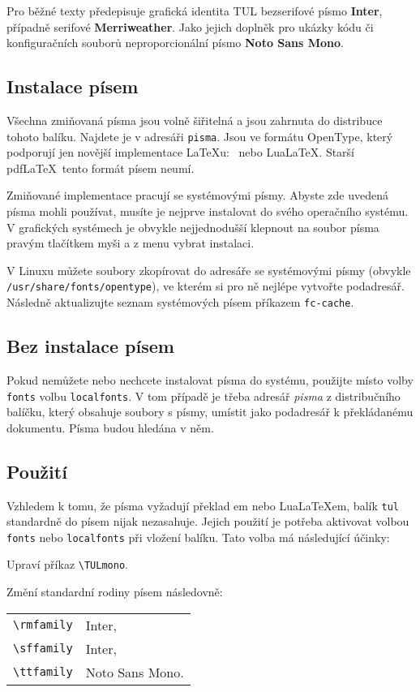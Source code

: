 \documentclass[a4paper,12pt,twoside,FP]{article}
\makeatletter
\newcommand{\cmdfont}[1]{\texttt{\color{\tulcolor}#1}}
\newcommand{\cmdnoindex}[1]{\cmdfont{\textbackslash #1}}
\newcommand{\cmd}[1]{\cmdnoindex{#1}\index{#1@\textbackslash #1}}
\makeatother
\begin{document}
Pro běžné texty předepisuje grafická identita TUL bezserifové písmo
\textbf{Inter}, případně serifové \textbf{Merriweather}. Jako jejich doplněk
pro ukázky kódu či konfiguračních souborů neproporcionální písmo \textbf{Noto
Sans Mono}.


\subsection{Instalace písem}

Všechna zmiňovaná písma jsou volně šiřitelná a jsou zahrnuta do distribuce
tohoto balíku. Najdete je v adresáři \cmdfont{pisma}. Jsou ve formátu OpenType,
který podporují jen novější implementace \LaTeX u: \XeLaTeX\ nebo Lua\LaTeX.
Starší pdf\LaTeX\ tento formát písem neumí.

Zmiňované implementace pracují se systémovými písmy. Abyste zde uvedená písma
mohli používat, musíte je nejprve instalovat do svého operačního systému. V
grafických systémech je obvykle nejjednodušší klepnout na soubor písma pravým
tlačítkem myši a z menu vybrat instalaci.

V Linuxu můžete soubory zkopírovat do adresáře se systémovými písmy (obvykle
\cmdfont{/usr/share/fonts/opentype}), ve kterém si pro ně nejlépe vytvořte
podadresář. Následně aktualizujte seznam systémových písem příkazem
\cmdfont{fc-cache}.


\subsection{Bez instalace písem}

Pokud nemůžete nebo nechcete instalovat písma do systému, použijte místo volby
\cmdfont{fonts} volbu \cmdfont{localfonts}. V tom případě je třeba adresář
\emph{pisma} z distribučního balíčku, který obsahuje soubory s písmy, umístit
jako podadresář k překládanému dokumentu. Písma budou hledána v něm.


\subsection{Použití}

Vzhledem k tomu, že písma vyžadují překlad \XeLaTeX em nebo Lua\LaTeX em, balík
\cmdfont{tul} standardně do písem nijak nezasahuje. Jejich použití je potřeba
aktivovat volbou \cmdfont{fonts} nebo \cmdfont{localfonts} při vložení balíku.
Tato volba má následující účinky:

\begin{itemize*}
\item Upraví příkaz \cmd{TULmono}.
\item Změní standardní rodiny písem následovně:\\
\begin{tabular}{@{}ll}
\cmdfont{\textbackslash rmfamily} & Inter, \\
\cmdfont{\textbackslash sffamily} & Inter, \\
\cmdfont{\textbackslash ttfamily} & Noto Sans Mono.
\end{tabular}
\end{itemize*}
\end{document}
